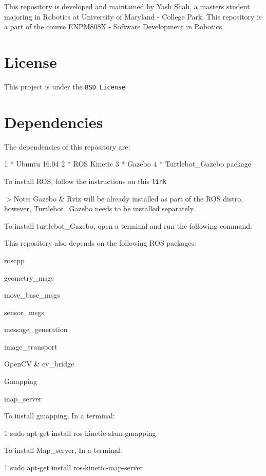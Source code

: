 This repository is developed and maintained by Yash Shah, a masters student majoring in Robotics at University of Maryland -\/ College Park. This repository is a part of the course E\+N\+P\+M808X -\/ Software Development in Robotics.

\section*{License}

This project is under the {\tt B\+SD License}

\section*{Dependencies}

The dependencies of this repository are\+: 
\begin{DoxyCode}
1 * Ubuntu 16.04
2 * ROS Kinetic
3 * Gazebo
4 * Turtlebot\_Gazebo package
\end{DoxyCode}


To install R\+OS, follow the instructions on this {\tt link}

$>$Note\+: Gazebo \& Rviz will be already installed as part of the R\+OS distro, however, Turtlebot\+\_\+\+Gazebo needs to be installed separately.

To install turtlebot\+\_\+\+Gazebo, open a terminal and run the following command\+:




This repository also depends on the following R\+OS packages\+:
\begin{DoxyItemize}
\item roscpp
\item geometry\+\_\+msgs
\item move\+\_\+base\+\_\+msgs
\item sensor\+\_\+msgs
\item message\+\_\+generation
\item image\+\_\+transport
\item Open\+CV \& cv\+\_\+bridge
\item Gmapping
\item map\+\_\+server
\end{DoxyItemize}

To install gmapping, In a terminal\+: 
\begin{DoxyCode}
1 sudo apt-get install ros-kinetic-slam-gmapping
\end{DoxyCode}
 To install Map\+\_\+server, In a terminal\+: 
\begin{DoxyCode}
1 sudo apt-get install ros-kinetic-map-server
\end{DoxyCode}


